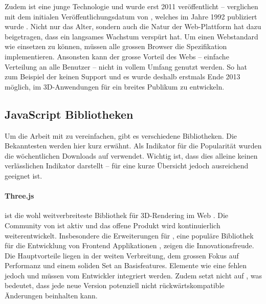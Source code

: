 Zudem ist  eine junge Technologie und wurde erst 2011 veröffentlicht \cite{webGl1Spec} – verglichen mit dem initialen Veröffentlichungsdatum von , welches im Jahre 1992 publiziert wurde \cite{openGlSpec}.
Nicht nur das Alter, sondern auch die Natur der Web-Plattform hat dazu beigetragen, dass  ein langsames Wachstum verspürt hat. Um einen Webstandard wie  einsetzen zu können, müssen alle grossen Browser die Spezifikation implementieren. Ansonsten kann der grosse Vorteil des Webs – einfache Verteilung an alle Benutzer – nicht in vollem Umfang genutzt werden. So hat zum Beispiel der  keinen Support und es wurde deshalb erstmals Ende 2013 möglich, im  3D-Anwendungen für ein breites Publikum zu entwickeln.

\subsection{JavaScript Bibliotheken}
Um die Arbeit mit  zu vereinfachen, gibt es verschiedene  Bibliotheken. Die Bekanntesten werden hier kurz erwähnt. Als Indikator für die Popularität wurden die wöchentlichen Downloads auf  verwendet. Wichtig ist, dass dies alleine keinen verlässlichen Indikator darstellt – für eine kurze Übersicht jedoch ausreichend geeignet ist.

\paragraph{Three.js}
 ist die wohl weitverbreiteste Bibliothek für 3D-Rendering im Web \cite{threeNpmPackage}.
Die Community von  ist aktiv und das offene Produkt wird kontinuierlich weiterentwickelt. Insbesondere die Erweiterungen \cite{threeFiberGithub} für , eine populäre Bibliothek für die Entwicklung von Frontend Applikationen \cite{reactNpmPackage}, zeigen die Innovationsfreude.
Die Hauptvorteile liegen in der weiten Verbreitung, dem grossen Fokus auf Performanz und einem soliden Set an Basisfeatures. Elemente wie eine  fehlen jedoch und müssen vom Entwickler integriert werden. Zudem setzt  nicht auf , was bedeutet, dass jede neue Version potenziell nicht rückwärtskompatible Änderungen beinhalten kann.

